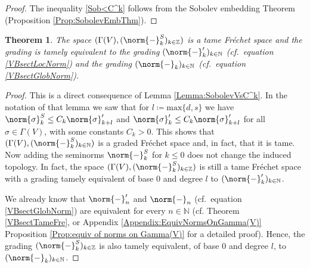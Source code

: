 \documentclass[12pt,a4paper]{article}
\theoremstyle{plain}
\newtheorem{theorem}{Theorem}[subsection]
\theoremstyle{definition}
\newcommand{\N}{\mathbb{N}}
\newcommand{\nnorm}[2]{\norm{#1}_{#2}}
\begin{document}
\begin{proof}
The inequality \eqref{Sob<C^k} follows from the Sobolev embedding Theorem (Proposition \ref{Prop:SobolevEmbThm}).
\end{proof}

\begin{theorem}
\label{Theorem:C^k-Norm=Sob-Norm}
The space $(\Gamma(V),(\nnorm{-}{k}^S)_{k\in \mathbb{Z}})$ is a tame Fréchet space and the grading is tamely equivalent to the grading $(\nnorm{-}{k}')_{k\in \N}$ (cf.~equation \eqref{VBsectLocNorm}) and the grading $(\nnorm{-}{k})_{k\in \N}$ (cf.~equation \eqref{VBsectGlobNorm}).   
\end{theorem}
\begin{proof}
This is a direct consequence of Lemma \ref{Lemma:SobolevVsC^k}. In the notation of that lemma we saw that for $l\coloneqq \mathrm{max}\{d,s\}$ we have $\nnorm{\sigma}{k}^S\leq C_k\nnorm{\sigma}{k+l}'$ and $\nnorm{\sigma}{k}'\leq C_k\nnorm{\sigma}{k+l}'$ for all $\sigma \in \Gamma(V)$, with some constants $C_k>0$. This shows that $(\Gamma(V),(\nnorm{-}{k}^S)_{k\in \mathbb{N}})$ is a graded Fréchet space and, in fact, that it is tame. Now adding the seminorms $\nnorm{-}{k}^S$ for $k\leq 0$ does not change the induced topology. In fact, the space $(\Gamma(V),(\nnorm{-}{k}^S)_{k\in \mathbb{Z}})$ is still a tame Fréchet space with a grading tamely equivalent of base $0$ and degree $l$ to $(\nnorm{-}{k}')_{k\in \N}$.

We already know that $\nnorm{-}{n}'$ and $\nnorm{-}{n}$ (cf.~equation \eqref{VBsectGlobNorm}) are equivalent for every $n\in \N$ (cf. Theorem \ref{VBsectTameFre}, or Appendix \ref{Appendix:EquivNormsOnGamma(V)} Proposition \ref{Prop:equiv of norms on Gamma(V)} for a detailed proof). Hence, the grading $(\nnorm{-}{k}^S)_{k\in \mathbb{Z}}$ is also tamely equivalent, of base $0$ and degree $l$, to $(\nnorm{-}{k})_{k\in \N}$.
\end{proof}
\end{document}
